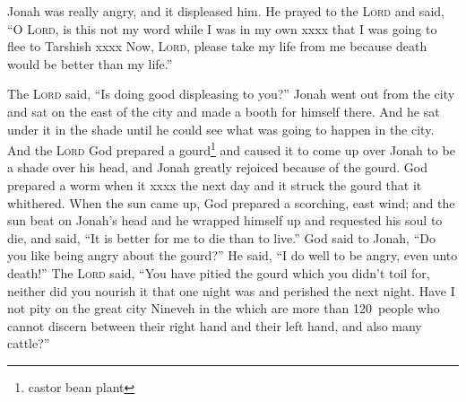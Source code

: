 
\begin{inparaenum}
     Jonah was really angry, and it displeased him.%
     He prayed to the \textsc{Lord} and said, ``O \textsc{Lord}, is this not my word while I was in my own xxxx that I was going to flee to Tarshish xxxx%
     Now, \textsc{Lord}, please take my life from me because death would be better than my life.''%
    
     The \textsc{Lord} said, ``Is doing good displeasing to you?''%
     Jonah went out from the city and sat on the east of the city and made a booth for himself there. And he sat under it in the shade until he could see what was going to happen in the city.%
     And the \textsc{Lord} God prepared a gourd\footnote{castor bean plant} and caused it to come up over Jonah to be a shade over his head, and Jonah greatly rejoiced because of the gourd.%
     God prepared a worm when it xxxx the next day and it struck the gourd that it whithered.%
     When the sun came up, God prepared a scorching, east wind; and the sun beat on Jonah's head and he wrapped himself up and requested his soul to die, and said, ``It is better for me to die than to live.''%
     God said to Jonah, ``Do you like being angry about the gourd?'' He said, ``I do well to be angry, even unto death!''%
     The \textsc{Lord} said, ``You have pitied the gourd which you didn't toil for, neither did you nourish it that one night was and perished the next night.%
     Have I not pity on the great city Nineveh in the which are more than 120~people who cannot discern between their right hand and their left hand, and also many cattle?''%
\end{inparaenum}
